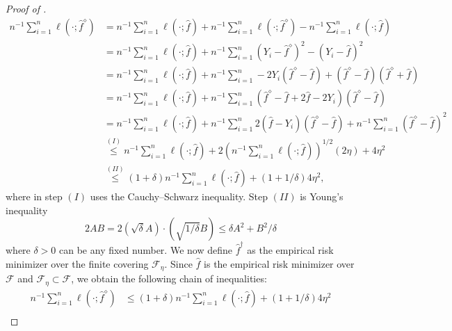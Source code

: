 \documentclass[12pt]{article}
\begin{document}
\begin{appendices}
\begin{proof}[Proof of ]
\begin{equation*}
\begin{aligned}
n^{-1} \sum_{i=1}^n \ell(\cdot ; \widehat{f}^{\diamond}) & =n^{-1} \sum_{i=1}^n \ell(\cdot ; \widehat{f})+n^{-1} \sum_{i=1}^n \ell(\cdot ; \widehat{f}^{\diamond})-n^{-1} \sum_{i=1}^n \ell(\cdot ; \widehat{f}) \\
& =n^{-1} \sum_{i=1}^n \ell(\cdot ; \widehat{f})+n^{-1} \sum_{i=1}^n(Y_i-\widehat{f}^{\diamond})^2-(Y_i-\widehat{f})^2 \\
& =n^{-1} \sum_{i=1}^n \ell(\cdot ; \widehat{f})+n^{-1} \sum_{i=1}^n-2 Y_i(\widehat{f}^{\diamond}-\widehat{f})+(\widehat{f}^{\diamond}-\widehat{f})(\widehat{f}^{\diamond}+\widehat{f}) \\
& =n^{-1} \sum_{i=1}^n \ell(\cdot ; \widehat{f})+n^{-1} \sum_{i=1}^n(\widehat{f}^{\diamond}-\widehat{f}+2 \widehat{f}-2 Y_i)(\widehat{f}^{\diamond}-\widehat{f}) \\
& =n^{-1} \sum_{i=1}^n \ell(\cdot ; \widehat{f})+n^{-1} \sum_{i=1}^n 2(\widehat{f}-Y_i)(\widehat{f}^{\diamond}-\widehat{f})+n^{-1} \sum_{i=1}^n(\widehat{f}^{\diamond}-\widehat{f})^2 \\
& \stackrel{(I)}{\leq} n^{-1} \sum_{i=1}^n \ell(\cdot ; \widehat{f})+2\left(n^{-1} \sum_{i=1}^n \ell(\cdot ; \widehat{f})\right)^{1 / 2} (2\eta)+4 \eta^2 \\
& \stackrel{(II)}{\leq}(1+\delta) n^{-1} \sum_{i=1}^n \ell(\cdot ; \widehat{f})+(1+1 / \delta) 4 \eta^2,
\end{aligned}
\end{equation*}
where in step $(I)$ uses the Cauchy–Schwarz inequality. Step $(II)$ is Young's inequality 
\begin{equation*}
    2AB = 2 (\sqrt{\delta} A) \cdot (\sqrt{1/\delta} B) \leq \delta A^2 + B^2/\delta
\end{equation*}
where $\delta>0$ can be any fixed number. We now define $\widehat f^\dag$ as the empirical risk minimizer over the finite covering $\mathcal{F}_{\eta}$. Since $\widehat f$ is the empirical risk minimizer over $\mathcal{F}$ and $\mathcal{F}_{\eta}\subset \mathcal{F}$, we obtain the following chain of inequalities:
\begin{equation*}
\begin{aligned}
n^{-1} \sum_{i=1}^n \ell(\cdot ; \widehat{f}^{\diamond}) & \leq(1+\delta) n^{-1} \sum_{i=1}^n \ell(\cdot ; \widehat{f})+(1+1 / \delta) 4 \eta^2 \\

\end{aligned}
\end{equation*}
\end{proof}
\end{appendices}
\end{document}
